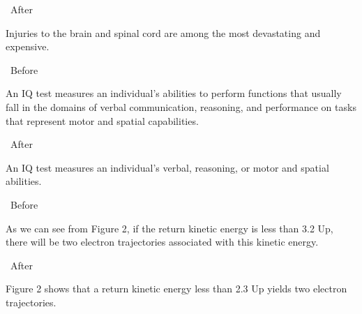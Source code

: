 \documentclass[a4paper, 12pt]{article}
\begin{document}
\vspace{4pt}\par\textbullet\ After
\par Injuries to the brain and spinal cord are among the most devastating and expensive.

\vspace{4pt}\par\textbullet\ Before
\par An IQ test measures an individual’s abilities to perform functions that usually fall in the domains of verbal communication, reasoning, and performance on tasks that represent motor and spatial capabilities.

\vspace{4pt}\par\textbullet\ After
\par An IQ test measures an individual's verbal, reasoning, or motor and spatial abilities.

\vspace{4pt}\par\textbullet\ Before
\par As we can see from Figure 2, if the return kinetic energy is less than 3.2 Up, there will be two electron trajectories associated with this kinetic energy.

\vspace{4pt}\par\textbullet\ After
\par Figure 2 shows that a return kinetic energy less than 2.3 Up yields two electron trajectories.
\end{document}
